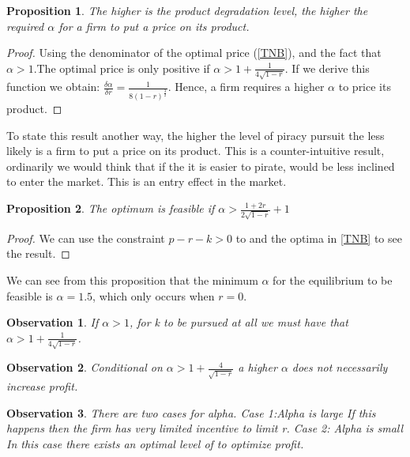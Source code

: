 \documentclass{article}
\newtheorem{proposition}{Proposition}
\newtheorem{observation}{Observation}
\begin{document}
\begin{proposition}
The higher is the product degradation level, the higher the required $\alpha$ for a firm to put a price on its product. 
\end{proposition}

\begin{proof}
Using the denominator of the optimal price (\ref{TNB}), and the fact that $\alpha>1$.The optimal price is only positive if $\alpha > 1 + \frac{1}{4 \sqrt{1-r}}$. If we derive this function we obtain: $\frac{\delta \alpha}{\delta r}=\frac{1}{8(1-r)^{\frac{3}{2}}}$. Hence, a firm requires a higher $\alpha$ to price its product.
\end{proof}

To state this result another way, the higher the level of piracy pursuit the less likely is a firm to put a price on its product. This is a counter-intuitive result, ordinarily we would think that if the it is easier to pirate, would be less inclined to enter the market. This is an entry effect in the market. 

\begin{proposition}
The optimum is feasible if $\alpha>\frac{1+2r}{2\sqrt{1-r}}+1$
\end{proposition}

\begin{proof}
We can use the constraint $p-r-k>0$ to and the optima in \ref{TNB} to see the result.
\end{proof}

We can see from this proposition that the minimum $\alpha$ for the equilibrium to be feasible is $\alpha=1.5$, which only occurs when $r = 0$. 

\begin{observation}
If $\alpha>1$, for k to be pursued at all we must have that $\alpha > 1 + \frac{1}{4\sqrt{1-r}}$. 
\end{observation}

\begin{observation}
Conditional on  $\alpha > 1 + \frac{4}{\sqrt{1-r}}$ a higher $\alpha$ does not necessarily increase profit. 
\end{observation}

\begin{observation}
There are two cases for alpha. 
Case 1:Alpha is large
If this happens then the firm has very limited incentive to limit r. 
Case 2: Alpha is small
In this case there exists an optimal level of  to optimize profit. 
\end{observation}
\end{document}
